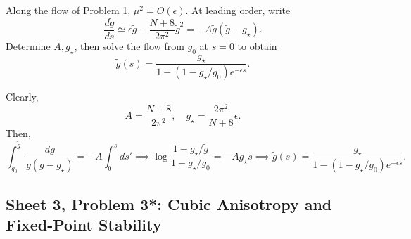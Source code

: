 Along the flow of Problem 1, $\mu^2=O(\epsilon)$. At leading order,
write
\begin{equation}
    \frac{d\tilde g}{ds}
    \simeq\epsilon\tilde g-\frac{N+8}{2\pi^2}\tilde g^{2}
    =-A\tilde g(\tilde g-g_\star).
\end{equation}
Determine $A,g_\star$, then solve the flow from $g_0$ at $s=0$
to obtain
\begin{equation}
    \tilde g(s)=\frac{g_\star}
    {1-(1-g_\star/g_0)e^{-\epsilon s}}.
\end{equation}
\begin{solution}
    Clearly,
    \begin{equation}
        A = \frac{N+8}{2\pi^2}, \quad g_\star  = \frac{2\pi^2}{N+8}\epsilon.
    \end{equation}
    Then,
    \begin{equation}
        \int_{g_0}^{\tilde g}\frac{dg}{g(g-g_\star)} = -A\int^s_0ds' \implies \log\frac{1-g_\star /\tilde g}{1 -g_\star /g_0} = -Ag_\star s \implies  \tilde g(s)=\frac{g_\star}
    {1-(1-g_\star/g_0)e^{-\epsilon s}}.
    \end{equation}
\end{solution}

\subsection{Sheet 3, Problem 3*: Cubic Anisotropy and Fixed-Point Stability}

